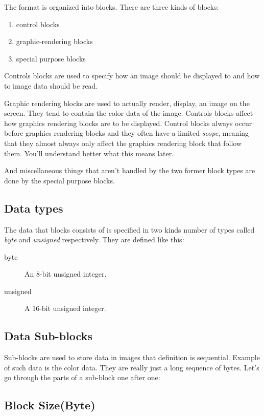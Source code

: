 \begin{refsection}
  The \gif format is organized into blocks. There are three kinds of
  blocks:

  \begin{enumerate}
  \item  control blocks
  \item graphic-rendering blocks
  \item special purpose blocks
  \end{enumerate}

  Controls blocks are used to specify how an image should be
  displayed to and how to image data should be read.

  Graphic rendering blocks are used to actually render, display, an
  image on the screen. They tend to contain the color data of the
  image. Controls blocks affect how graphics rendering blocks are to
  be displayed. Control blocks always occur before graphics rendering
  blocks and they often have a limited \textit{scope}, meaning that
  they almost always only affect the graphics rendering block that
  follow them. You'll understand better what this means later.

  And miscellaneous things that aren't handled by the two former
  block types are done by the special purpose blocks.

  \subsection{Data types}

  The data that blocks consists of is specified in two kinds number of
  types called \textit{byte} and \textit{unsigned} respectively. They
  are defined like this:

  \begin{description}
  \item[byte] An 8-bit unsigned integer.
  \item[unsigned] A 16-bit unsigned integer.
  \end{description}

  \subsection{Data Sub-blocks}

  Sub-blocks are used to store data in \gif images that definition is
  sequential. Example of such data is the color data. They are really
  just a long sequence of bytes. Let's go through the parts of a sub-block one after one:

  \subsection*{Block Size(Byte)}


\end{refsection}
